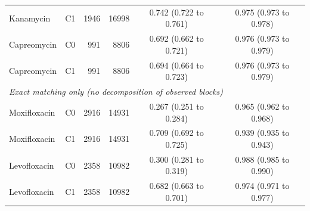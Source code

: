 \begin{tabular}{llrrcc}
Kanamycin & C1 & 1946 & 16998 & 0.742 (0.722 to 0.761) & 0.975 (0.973 to 0.978) \\
Capreomycin & C0 & 991 & 8806 & 0.692 (0.662 to 0.721) & 0.976 (0.973 to 0.979) \\
Capreomycin & C1 & 991 & 8806 & 0.694 (0.664 to 0.723) & 0.976 (0.973 to 0.979) \\
\midrule
\multicolumn{6}{l}{\textit{Exact matching only (no decomposition of observed blocks)}} \\
\midrule
Moxifloxacin & C0 & 2916 & 14931 & 0.267 (0.251 to 0.284) & 0.965 (0.962 to 0.968) \\
Moxifloxacin & C1 & 2916 & 14931 & 0.709 (0.692 to 0.725) & 0.939 (0.935 to 0.943) \\
Levofloxacin & C0 & 2358 & 10982 & 0.300 (0.281 to 0.319) & 0.988 (0.985 to 0.990) \\
Levofloxacin & C1 & 2358 & 10982 & 0.682 (0.663 to 0.701) & 0.974 (0.971 to 0.977) \\
\bottomrule
\end{tabular}
